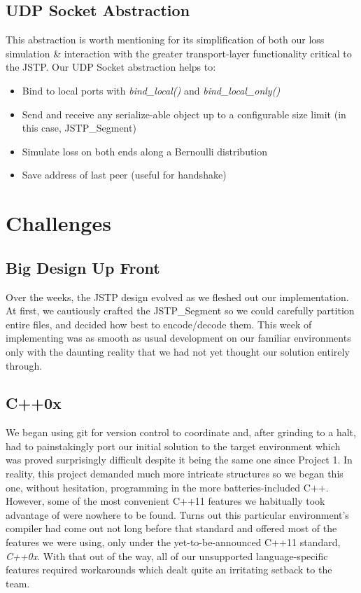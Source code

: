 \documentclass{article}
\begin{document}
\subsection{UDP Socket Abstraction}
This abstraction is worth mentioning for its simplification of both our loss simulation \& interaction with the greater transport-layer functionality critical to the JSTP.
Our UDP Socket abstraction helps to:
\begin{itemize}
    \item Bind to local ports with \emph{bind\_local()} and \emph{bind\_local\_only()}
    \item Send and receive any serialize-able object up to a configurable size limit (in this case, JSTP\_Segment)
    \item Simulate loss on both ends along a Bernoulli distribution
    \item Save address of last peer (useful for handshake)
\end{itemize}

\break
\section{Challenges}
\subsection{Big Design Up Front}
Over the weeks, the JSTP design evolved as we fleshed out our implementation.
At first, we cautiously crafted the JSTP\_Segment so we could carefully partition entire files, and decided how best to encode/decode them.
This week of implementing was as smooth as usual development on our familiar environments only with the daunting reality that we had not
yet thought our solution entirely through.

\subsection{C++0x}
We began using git for version control to coordinate and, after grinding to a halt, had to painstakingly port our initial solution to the target environment which was proved surprisingly difficult despite it being the same one since Project 1.
In reality, this project demanded much more intricate structures so we began this one, without hesitation, programming in the more batteries-included C++.
However, some of the most convenient C++11 features we habitually took advantage of were nowhere to be found.
Turns out this particular environment's compiler had come out not long before that standard and offered most of the features we were using, only under the yet-to-be-announced C++11 standard, \emph{C++0x}.
With that out of the way, all of our unsupported language-specific features required workarounds which dealt quite an irritating setback to the team.
\end{document}
